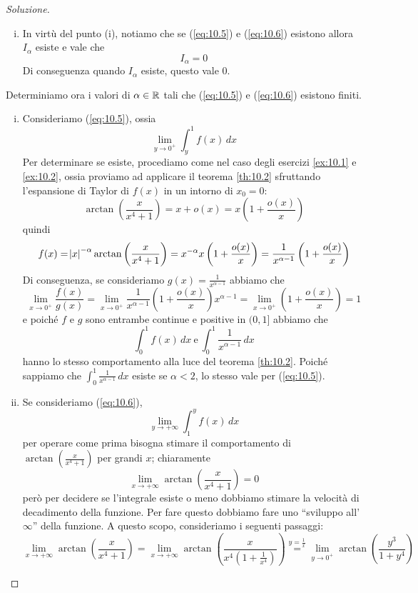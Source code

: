 \begin{proof}[Soluzione]
\begin{enumerate}[(i)]
        \item In virtù del punto (i), notiamo che se (\ref{eq:10.5}) e (\ref{eq:10.6}) esistono allora $I_\alpha$ esiste e vale che
        \[
        I_\alpha = 0
        \]
        Di conseguenza quando $I_\alpha$ esiste, questo vale 0.
    \end{enumerate}
    Determiniamo ora i valori di $\alpha\in\amsbb{R}$ tali che (\ref{eq:10.5}) e (\ref{eq:10.6}) esistono finiti.
    \begin{enumerate}[(i)]
        \item Consideriamo (\ref{eq:10.5}), ossia
        \[
        \lim_{y\to 0^+} \int_y^1 f(x)\, dx 
        \]
        Per determinare se esiste, procediamo come nel caso degli esercizi \ref{ex:10.1} e \ref{ex:10.2}, ossia proviamo ad applicare il teorema \ref{th:10.2} sfruttando l'espansione di Taylor di $f(x)$ in un intorno di $x_0=0$:
        \[
        \arctan\left(\frac{x}{x^4+1}\right) = x+o(x) = x\left(1+\frac{o(x)}{x}\right)
        \]
        quindi
        \[
        f(x) = \abs{x}^{-\alpha} \arctan\left(\frac{x}{x^4+1}\right) = {x}^{-\alpha} x \left(1+\frac{o(x)}{x}\right) = \frac{1}{x^{\alpha-1}} \left(1+\frac{o(x)}{x}\right) 
        \]
        Di conseguenza, se consideriamo $g(x) = \frac{1}{x^{\alpha-1}}$ abbiamo che
        \[
        \lim_{x\to 0^+} \frac{f(x)}{g(x)} = \lim_{x\to 0^+}\frac{1}{x^{\alpha-1}}\left(1+\frac{o(x)}{x}\right)x^{\alpha-1} = \lim_{x\to 0^+} \left(1+\frac{o(x)}{x}\right) = 1
        \]
        e poiché $f$ e $g$ sono entrambe continue e positive in $(0,1]$ abbiamo che
        \[
        \int_0^1 f(x)\, dx \ \text{e} \ \int_0^1 \frac{1}{x^{\alpha-1}}\, dx
        \]
        hanno lo stesso comportamento alla luce del teorema \ref{th:10.2}. Poiché sappiamo che $\int_0^1 \frac{1}{x^{\alpha-1}}\, dx$ esiste se $\alpha<2$, lo stesso vale per (\ref{eq:10.5}).
        \item Se consideriamo (\ref{eq:10.6}), 
        \[
        \lim_{y\to +\infty} \int_1^y f(x)\, dx 
        \]
        per operare come prima bisogna stimare il comportamento di $\arctan\left(\frac{x}{x^4+1}\right)$ per grandi $x$; chiaramente 
        \[
        \lim_{x\to+\infty} \arctan\left(\frac{x}{x^4+1}\right)=0
        \]
        però per decidere se l'integrale esiste o meno dobbiamo stimare la velocità di decadimento della funzione. Per fare questo dobbiamo fare uno ``sviluppo all'$\infty$'' della funzione. A questo scopo, consideriamo i seguenti passaggi:
        \[
        \lim_{x\to +\infty} \arctan\left(\frac{x}{x^4+1}\right) = \lim_{x\to +\infty} \arctan\left(\frac{x}{x^4\left(1+\frac{1}{x^4}\right)}\right ) \overset{y=\frac{1}{x}}{=} \lim_{y\to 0^+} \arctan\left(\frac{y^3}{1+y^4}\right)
\]
\end{enumerate}
\end{proof}
